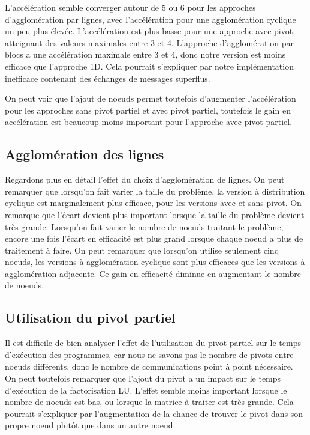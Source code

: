 \documentclass[12pt,letterpaper]{article} %
\begin{document}
L'accélération semble converger autour de 5 ou 6 pour les approches d'agglomération par lignes,
avec l'accélération pour une agglomération cyclique un peu plus élevée. L'accélération est
plus basse pour une approche avec pivot, atteignant des valeurs maximales entre 3 et 4. L'approche
d'agglomération par blocs a une accélération maximale entre 3 et 4, donc notre version est moins
efficace que l'approche 1D. Cela pourrait s'expliquer par notre implémentation inefficace
contenant des échanges de messages superflus.

On peut voir que l'ajout de noeuds permet toutefois d'augmenter l'accélération pour les approches
sans pivot partiel et avec pivot partiel, toutefois le gain en accélération est beaucoup moins
important pour l'approche avec pivot partiel.

\subsection{Agglomération des lignes}
Regardons plus en détail l'effet du choix d'agglomération de lignes. On peut remarquer
que lorsqu'on fait varier la taille du problème, la version à distribution cyclique
est marginalement plus efficace, pour les versions avec et sans pivot. On remarque
que l'écart devient plus important lorsque la taille du problème devient très grande.
Lorsqu'on fait varier le nombre de noeuds traitant le problème, encore une fois l'écart
en efficacité est plus grand lorsque chaque noeud a plus de traitement à faire. On peut
remarquer que lorsqu'on utilise seulement cinq noeuds, les versions à agglomération cyclique
sont plus efficaces que les versions à agglomération adjacente. Ce gain en efficacité
diminue en augmentant le nombre de noeuds.

\subsection{Utilisation du pivot partiel}
Il est difficile de bien analyser l'effet de l'utilisation du pivot partiel sur le
temps d'exécution des programmes, car nous ne savons pas le nombre de pivots
entre noeuds différents, donc le nombre de communications point à point nécessaire.
On peut toutefois remarquer que l'ajout du pivot a un impact sur le temps d'exécution
de la factorisation LU. L'effet semble moins important lorsque le nombre de 
noeuds est bas, ou lorsque la matrice à traiter est très grande. Cela pourrait s'expliquer
par l'augmentation de la chance de trouver le pivot dans son propre noeud plutôt que
dans un autre noeud.
\end{document}
